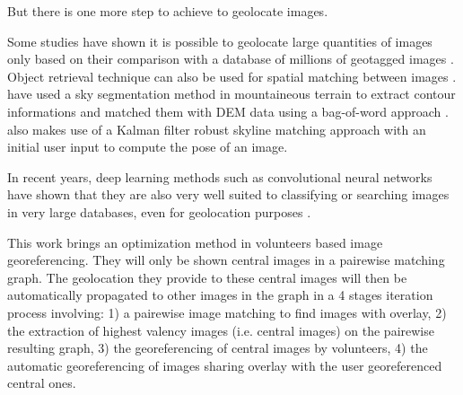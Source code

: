\documentclass[fleqn,10pt]{wlpeerj} %
\begin{document}
But there is one more step to achieve to geolocate images. 
\fi

Some studies have shown it is possible to geolocate large quantities of 
images only based on their comparison with a database of millions of geotagged 
images \citep{hays2015,weyand2016}. Object retrieval technique can also be used 
for spatial matching between images \citep{philbin2007}. 
\cite{baatz2012} have used a sky segmentation method in mountaineous terrain 
to extract contour informations and matched them with DEM data using a 
bag-of-word approach \citep{feifei2005}. \cite{produit2014} also makes use
of a Kalman filter robust skyline matching approach with an initial user input 
to compute the pose of an image.


In recent years, deep learning methods such as convolutional neural networks 
\citep{lecun2015deep} have shown that they are also very well suited to classifying 
or searching images in very large databases, even for geolocation purposes \citep{weyand2016}.

This work brings an optimization method in volunteers based image georeferencing.
They will only be shown central images in a pairewise matching graph. 
The geolocation they provide to these central images will then be automatically 
propagated to other images in the graph in a 4 stages iteration process involving:
1) a pairewise image matching to find images with overlay, 
2) the extraction of highest valency images (i.e. central images) on the 
pairewise resulting graph, 
3) the georeferencing of central images by volunteers, 
4) the automatic georeferencing of images sharing overlay with the user 
georeferenced central ones.

\end{document}

